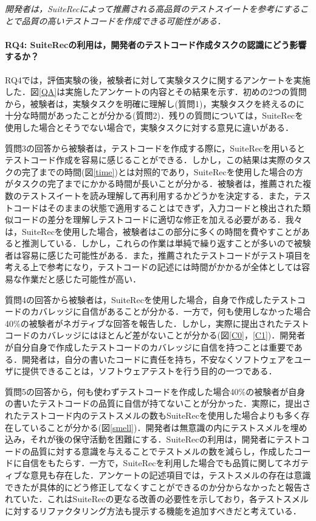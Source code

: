 \documentclass[12pt]{jarticle} %
\begin{document}
\vspace{\baselineskip}

\begin{breakbox}
\textit{開発者は，{\sf SuiteRec}によって推薦される高品質のテストスイートを参考にすることで品質の高いテストコードを作成できる可能性がある．}
\end{breakbox}

\paragraph{RQ4: {\sf SuiteRec}の利用は，開発者のテストコード作成タスクの認識にどう影響するか？}

RQ4では，評価実験の後，被験者に対して実験タスクに関するアンケートを実施した．図\ref{QA}は実施したアンケートの内容とその結果を示す．初めの2つの質問から，被験者は，実験タスクを明確に理解し(質問1)，実験タスクを終えるのに十分な時間があったことが分かる(質問2)．残りの質問については，{\sf SuiteRec}を使用した場合とそうでない場合で，実験タスクに対する意見に違いがある．

質問3の回答から被験者は，テストコードを作成する際に，{\sf SuiteRec}を用いるとテストコード作成を容易に感じることができる．しかし，この結果は実際のタスクの完了までの時間(図\ref{time})とは対照的であり，{\sf SuiteRec}を使用した場合の方がタスクの完了までにかかる時間が長いことが分かる．被験者は，推薦された複数のテストスイートを読み理解して再利用するかどうかを決定する．また，テストコードはそのままの状態で適用することはできず，入力コードと検出された類似コードの差分を理解しテストコードに適切な修正を加える必要がある．我々は，{\sf SuiteRec}を使用した場合，被験者はこの部分に多くの時間を費やすことがあると推測している．しかし，これらの作業は単純で繰り返すことが多いので被験者は容易に感じた可能性がある．また，推薦されたテストコードがテスト項目を考える上で参考になり，テストコードの記述には時間がかかるが全体としては容易な作業だと感じた可能性が高い．

質問4の回答から被験者は，{\sf SuiteRec}を使用した場合，自身で作成したテストコードのカバレッジに自信があることが分かる．一方で，何も使用しなかった場合40\%の被験者がネガティブな回答を報告した．しかし，実際に提出されたテストコードのカバレッジにはほとんど差がないことが分かる(図\ref{C0}，\ref{C1})．開発者が自分自身で作成したテストコードのカバレッジに自信を持つことは重要である．開発者は，自分の書いたコードに責任を持ち，不安なくソフトウェアをユーザに提供できることは，ソフトウェアテストを行う目的の一つである．

質問5の回答から，何も使わずテストコードを作成した場合40\%の被験者が自身の書いたテストコードの品質に自信が持てないことが分かった．実際に，提出されたテストコード内のテストスメルの数も{\sf SuiteRec}を使用した場合よりも多く存在していることが分かる(図\ref{smell})．開発者は無意識の内にテストスメルを埋め込み，それが後の保守活動を困難にする．{\sf SuiteRec}の利用は，開発者にテストコードの品質に対する意識を与えることでテストメルの数を減らし，作成したコードに自信をもたらす．一方で，{\sf SuiteRec}を利用した場合でも品質に関してネガティブな意見も存在した．アンケートの記述項目では，テストスメルの存在は意識できたが具体的にどう修正してなくすことができるのか分からなかったと報告されていた．これは{\sf SuiteRec}の更なる改善の必要性を示しており，各テストスメルに対するリファクタリング方法も提示する機能を追加すべきだと考えている．
\end{document}
